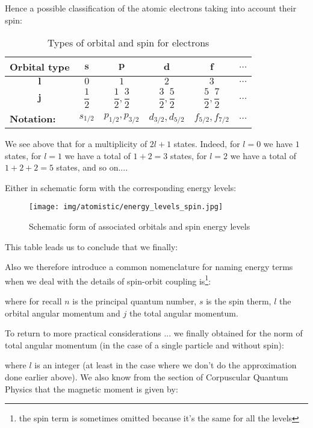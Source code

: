 	Hence a possible classification of the atomic electrons taking into account their spin\label{types of orbital and spin}:
	\begin{table}[H]
		\centering
		\renewcommand{\arraystretch}{2.6}
		\begin{tabular}{|c|c|c|c|c|c|}
		\hline
		\rowcolor[HTML]{9B9B9B} 
		\textbf{Orbital type} & \textbf{$\pmb{s}$} & \textbf{$\pmb{p}$} & \textbf{$\pmb{d}$} & \textbf{$\pmb{f}$} & \textbf{$\pmb{\ldots}$} \\ \hline
		\cellcolor[HTML]{9B9B9B}\textbf{$\pmb{l}$} & $0$ & $1$ & $2$ & $3$ & $\ldots$ \\ \hline
		\cellcolor[HTML]{9B9B9B}\textbf{$\pmb{j}$} & $\dfrac{1}{2}$ & $\dfrac{1}{2},\dfrac{3}{2}$ & $\dfrac{3}{2},\dfrac{5}{2}$ & $\dfrac{5}{2},\dfrac{7}{2}$ & $\ldots$ \\ \hline
		\multicolumn{1}{|l|}{\cellcolor[HTML]{9B9B9B}\textbf{Notation:}} & $s_{1/2}$ & $p_{1/2},p_{3/2}$ & $d_{3/2},d_{5/2}$ & $f_{5/2},f_{7/2}$ & $\ldots$ \\ \hline
		\end{tabular}
		\caption{Types of orbital and spin for electrons}
	\end{table}
	We see above that for a multiplicity of $2l+1$ states. Indeed, for $l=0$ we have $1$ states, for $l=1$ we have a total of $1+2=3$ states, for $l=2$ we have a total of $1+2+2=5$ states, and so on....
	
	Either in schematic form with the corresponding energy levels:
	\begin{figure}[H]
		\centering
		\texttt{[image: img/atomistic/energy\_levels\_spin.jpg]}	
		\caption{Schematic form of associated orbitals and spin energy levels}
	\end{figure}
	This table leads us to conclude that we finally:
	
	Also we therefore introduce a common nomenclature for naming energy terms when we deal with the details of spin-orbit coupling is\footnote{the spin term is sometimes omitted because it's the same for all the levels}:
	
	where for recall $n$ is the principal quantum number, $s$ is the spin therm, $l$ the orbital angular momentum and $j$ the total angular momentum.
	
	To return to more practical considerations ... we finally obtained for the norm of total angular momentum (in the case of a single particle and without spin):
	
	where $l$ is an integer (at least in the case where we don't do the approximation done earlier above). We also know from the section of Corpuscular Quantum Physics that the magnetic moment is given by:
	
